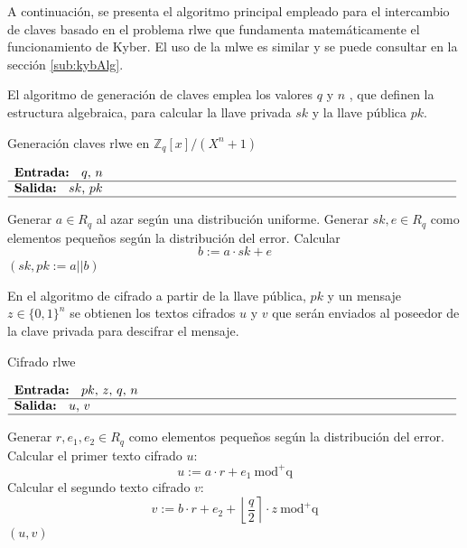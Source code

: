 A continuación, se presenta el algoritmo principal empleado para el intercambio de claves basado en el problema \gls{rlwe} que fundamenta matemáticamente el funcionamiento de Kyber. El uso de la \gls{mlwe} es similar y se puede consultar en la sección \ref{sub:kybAlg}.
\newline

El algoritmo de generación de claves emplea los valores \(q\) y \(n\) , que definen la estructura algebraica, para calcular la llave privada \(sk\)  y la llave pública \(pk\).
\begin{algorithm}[H]
	\caption{Generación claves \gls{rlwe} en $\mathbb{Z}_q[x]/(X^n + 1)$ \protect\footnotemark[\value{footnote}]} 
	$\begin{array}{p{\textwidth}}
		\textbf{Entrada: } \(q\), \(n\)\\ 
		\hline
		\textbf{Salida: } \(sk\), \(pk\) \\ 
		\hline
	\end{array}$
	\begin{algorithmic}[1]
		\State Generar \(a\in R_q\)  al azar según una distribución uniforme.
		\State Generar \(sk, e \in R_q\) como elementos pequeños según la distribución del error. \Statex {}
		\State Calcular 
		\begin{equation}
			b:=a\cdot sk + e
		\end{equation}
		\State \Return \((sk, pk:=a||b)\)
	\end{algorithmic}
\end{algorithm}

En el algoritmo de cifrado a partir de la llave pública, \(pk\) y un mensaje \(z\in \{0,1\}^n \) se obtienen los textos cifrados \(u\) y \(v\) que serán enviados al poseedor de la clave privada para descifrar el mensaje. 
\begin{algorithm}[H]
	\caption{Cifrado \gls{rlwe} \protect\footnotemark[\value{footnote}]} 
	$\begin{array}{p{\textwidth}}
		\textbf{Entrada: } \(pk\), \(z\), \(q\), \(n\)\\ 
		\hline
		\textbf{Salida: } \(u\), \(v\) \\ 
		\hline
	\end{array}$
	\begin{algorithmic}[1]
		\State Generar \(r, e_1, e_2 \in R_q\) como elementos pequeños según la distribución del error.
		\State Calcular el primer texto cifrado \(u\):
		\begin{equation}
			u:=a\cdot r + e_1 \ \text{mod}^{+}\text{q}
		\end{equation}
		\State Calcular el segundo texto cifrado \(v\):
		\begin{equation}
			v:=b\cdot r+e_2+\left\lfloor \dfrac{q}{2} \right\rceil \cdot z \ \text{mod}^{+}\text{q}
		\end{equation}
		\State \Return \((u,v)\) 
		 
	\end{algorithmic}
\end{algorithm}

